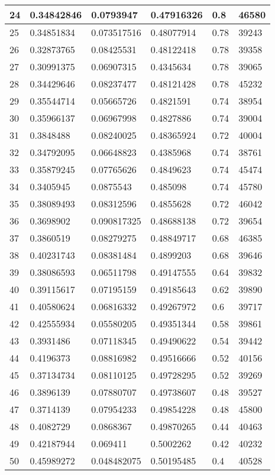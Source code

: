 \begin{longtable}{|l|l|l|l|l|l|}
24 & 0.34842846 & 0.0793947 & 0.47916326 & 0.8 & 46580 \\ \hline 
25 & 0.34851834 & 0.073517516 & 0.48077914 & 0.78 & 39243 \\ \hline 
26 & 0.32873765 & 0.08425531 & 0.48122418 & 0.78 & 39358 \\ \hline 
27 & 0.30991375 & 0.06907315 & 0.4345634 & 0.78 & 39065 \\ \hline 
28 & 0.34429646 & 0.08237477 & 0.48121428 & 0.78 & 45232 \\ \hline 
29 & 0.35544714 & 0.05665726 & 0.4821591 & 0.74 & 38954 \\ \hline 
30 & 0.35966137 & 0.06967998 & 0.4827886 & 0.74 & 39004 \\ \hline 
31 & 0.3848488 & 0.08240025 & 0.48365924 & 0.72 & 40004 \\ \hline 
32 & 0.34792095 & 0.06648823 & 0.4385968 & 0.74 & 38761 \\ \hline 
33 & 0.35879245 & 0.07765626 & 0.4849623 & 0.74 & 45474 \\ \hline 
34 & 0.3405945 & 0.0875543 & 0.485098 & 0.74 & 45780 \\ \hline 
35 & 0.38089493 & 0.08312596 & 0.4855628 & 0.72 & 46042 \\ \hline 
36 & 0.3698902 & 0.090817325 & 0.48688138 & 0.72 & 39654 \\ \hline 
37 & 0.3860519 & 0.08279275 & 0.48849717 & 0.68 & 46385 \\ \hline 
38 & 0.40231743 & 0.08381484 & 0.4899203 & 0.68 & 39646 \\ \hline 
39 & 0.38086593 & 0.06511798 & 0.49147555 & 0.64 & 39832 \\ \hline 
40 & 0.39115617 & 0.07195159 & 0.49185643 & 0.62 & 39890 \\ \hline 
41 & 0.40580624 & 0.06816332 & 0.49267972 & 0.6 & 39717 \\ \hline 
42 & 0.42555934 & 0.05580205 & 0.49351344 & 0.58 & 39861 \\ \hline 
43 & 0.3931486 & 0.07118345 & 0.49490622 & 0.54 & 39442 \\ \hline 
44 & 0.4196373 & 0.08816982 & 0.49516666 & 0.52 & 40156 \\ \hline 
45 & 0.37134734 & 0.08110125 & 0.49728295 & 0.52 & 39269 \\ \hline 
46 & 0.3896139 & 0.07880707 & 0.49738607 & 0.48 & 39527 \\ \hline 
47 & 0.3714139 & 0.07954233 & 0.49854228 & 0.48 & 45800 \\ \hline 
48 & 0.4082729 & 0.0868367 & 0.49870265 & 0.44 & 40463 \\ \hline 
49 & 0.42187944 & 0.069411 & 0.5002262 & 0.42 & 40232 \\ \hline 
50 & 0.45989272 & 0.048482075 & 0.50195485 & 0.4 & 40528 \\ \hline 
\end{longtable}